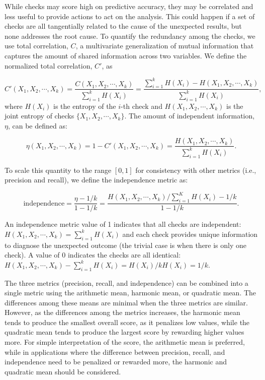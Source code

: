 \documentclass[
  12pt,
]{interact}
\begin{document}
While checks may score high on predictive accuracy, they may be
correlated and less useful to provide actions to act on the analysis.
This could happen if a set of checks are all tangentially related to the
cause of the unexpected results, but none addresses the root cause. To
quantify the redundancy among the checks, we use total correlation,
\(C\), a multivariate generalization of mutual information that captures
the amount of shared information across two variables. We define the
normalized total correlation, \(C'\), as

\[C'(X_1, X_2, \cdots, X_k) = \frac{C(X_1, X_2, \cdots, X_k)}{\sum_{i= 1}^k H(X_i)} = \frac{\sum_{i= 1}^k H(X_i) - H(X_1, X_2, \cdots, X_k)}{\sum_{i= 1}^k H(X_i)}, \]
where \(H(X_i)\) is the entropy of the \(i\)-th check and
\(H(X_1, X_2, \cdots, X_k)\) is the joint entropy of checks
\(\{X_1, X_2, \cdots, X_k\}\). The amount of independent information,
\(\eta\), can be defined as:

\[\eta(X_1, X_2, \cdots, X_k) = 1 - C'(X_1, X_2, \cdots, X_k) = \frac{H(X_1, X_2, \cdots, X_k)}{\sum_{i= 1}^k H(X_i)}.\]

To scale this quantity to the range \([0,1]\) for consistency with other
metrics (i.e., precision and recall), we define the independence metric
as:

\[\text{independence} = \frac{\eta - 1/k}{1 - 1/k}= \frac{H(X_1, X_2, \cdots, X_k)/\sum_{i= 1}^K H(X_i) - 1/k}{1 - 1/k}.\]

An independence metric value of 1 indicates that all checks are
independent: \(H(X_1, X_2, \cdots, X_k)=\sum_{i= 1}^k H(X_i)\) and each
check provides unique information to diagnose the unexpected outcome
(the trivial case is when there is only one check). A value of 0
indicates the checks are all identical:
\(H(X_1, X_2, \cdots, X_k)- \sum_{i= 1}^k H(X_i) = H(X_i)/ k H(X_i) = 1/k\).

The three metrics (precision, recall, and independence) can be combined
into a single metric using the arithmetic mean, harmonic mean, or
quadratic mean. The differences among these means are minimal when the
three metrics are similar. However, as the differences among the metrics
increases, the harmonic mean tends to produce the smallest overall
score, as it penalizes low values, while the quadratic mean tends to
produce the largest score by rewarding higher values more. For simple
interpretation of the score, the arithmetic mean is preferred, while in
applications where the difference between precision, recall, and
independence need to be penalized or rewarded more, the harmonic and
quadratic mean should be considered.
\end{document}
